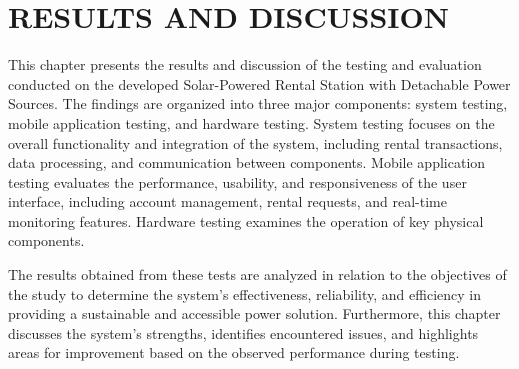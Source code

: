 \chapter{RESULTS AND DISCUSSION}

{\baselineskip

This chapter presents the results and discussion of the testing and evaluation conducted on the developed Solar-Powered Rental Station with Detachable Power Sources. The findings are organized into three major components: system testing, mobile application testing, and hardware testing. System testing focuses on the overall functionality and integration of the system, including rental transactions, data processing, and communication between components. Mobile application testing evaluates the performance, usability, and responsiveness of the user interface, including account management, rental requests, and real-time monitoring features. Hardware testing examines the operation of key physical components.

The results obtained from these tests are analyzed in relation to the objectives of the study to determine the system’s effectiveness, reliability, and efficiency in providing a sustainable and accessible power solution. Furthermore, this chapter discusses the system’s strengths, identifies encountered issues, and highlights areas for improvement based on the observed performance during testing.


}
